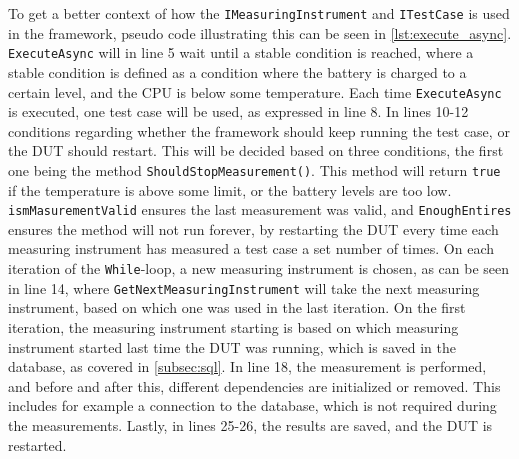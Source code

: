 To get a better context of how the \texttt{IMeasuringInstrument} and \texttt{ITestCase} is used in the framework, pseudo code illustrating this can be seen in \cref{lst:execute_async}. \texttt{ExecuteAsync} will in line 5 wait until a stable condition is reached, where a stable condition is defined as a condition where the battery is charged to a certain level, and the CPU is below some temperature. Each time \texttt{ExecuteAsync} is executed, one test case will be used, as expressed in line 8. In lines 10-12 conditions regarding whether the framework should keep running the test case, or the DUT should restart. This will be decided based on three conditions, the first one being the method \texttt{ShouldStopMeasurement()}. This method will return \texttt{true} if the temperature is above some limit, or the battery levels are too low. \texttt{ismMasurementValid} ensures the last measurement was valid, and \texttt{EnoughEntires} ensures the method will not run forever, by restarting the DUT every time each measuring instrument has measured a test case a set number of times. On each iteration of the \texttt{While}-loop, a new measuring instrument is chosen, as can be seen in line 14, where \texttt{GetNextMeasuringInstrument} will take the next measuring instrument, based on which one was used in the last iteration. On the first iteration, the measuring instrument starting is based on which measuring instrument started last time the DUT was running, which is saved in the database, as covered in \cref{subsec:sql}. In line 18, the measurement is performed, and before and after this, different dependencies are initialized or removed. This includes for example a connection to the database, which is not required during the measurements. Lastly, in lines 25-26, the results are saved, and the DUT is restarted. 



